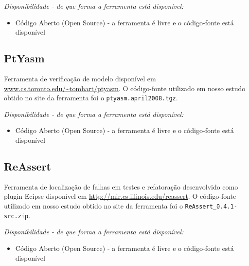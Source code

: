 \begin{description}

  \item {\it Disponibilidade - de que forma a ferramenta está disponível:}
    \begin{itemize}
      \item Código Aberto (Open Source) - a ferramenta é livre e o código-fonte está disponível
    \end{itemize}

\end{description}

\subsection{PtYasm}

Ferramenta de verificação de modelo disponível em
\url{www.cs.toronto.edu/~tomhart/ptyasm}. O código-fonte
utilizado em nosso estudo obtido no site da ferramenta foi o
\texttt{ptyasm.april2008.tgz}.

\begin{description}

  \item {\it Disponibilidade - de que forma a ferramenta está disponível:}
    \begin{itemize}
      \item Código Aberto (Open Source) - a ferramenta é livre e o código-fonte está disponível
    \end{itemize}

\end{description}

\subsection{ReAssert}

Ferramenta de localização de falhas em testes e refatoração
desenvolvido como plugin Ecipse disponível em
\url{http://mir.cs.illinois.edu/reassert}. O código-fonte utilizado em nosso
estudo obtido no site da ferramenta foi o \texttt{ReAssert\_0.4.1-src.zip}.

\begin{description}

  \item {\it Disponibilidade - de que forma a ferramenta está disponível:}
    \begin{itemize}
      \item Código Aberto (Open Source) - a ferramenta é livre e o código-fonte está disponível
    \end{itemize}

\end{description}

